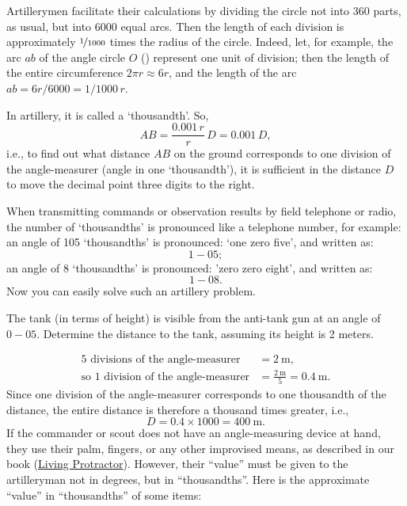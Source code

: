 Artillerymen facilitate their calculations by dividing the circle not into 360 parts, as usual, but into 6000 equal arcs. Then the length of each division is approximately $\nicefrac{1}{1000}$ times the radius of the circle. Indeed, let, for example, the arc $ab$ of the angle circle $O$ () represent one unit of division; then the length of the entire circumference $2 \pi r \approx 6r$, and the length of the arc $ab = 6r/6000 = 1/1000 \, r$.

In artillery, it is called a `thousandth'. So,
\begin{equation*}%
AB = \frac{0.001\,r}{r} \, D = 0.001 \, D,
\end{equation*}
i.e., to find out what distance $AB$ on the ground corresponds to one division of the angle-measurer (angle in one `thousandth'), it is sufficient in the distance $D$ to move the decimal point three digits to the right.

When transmitting commands or observation results by field telephone or radio, the number of `thousandths' is pronounced like a telephone number, for example: an angle of 105 `thousandths' is pronounced: `one zero five', and written as: 
\begin{equation*}%
1-05;
\end{equation*}
an angle of 8 `thousandths' is pronounced: 'zero zero eight', and written as:
\begin{equation*}%
1-08.
\end{equation*}
Now you can easily solve such an artillery problem.


\ques The tank (in terms of height) is visible from the anti-tank gun at an angle of $0-05$. Determine the distance to the tank, assuming its height is 2 meters.

\ans 
\begin{align*}%
\text{5 divisions of the angle-measurer} & = \SI{2}{\meter},\\
\text{so 1 division of the angle-measurer} & = \frac{\SI{2}{\meter}}{5} = \SI{0.4}{\meter}. 
\end{align*}
Since one division of the angle-measurer corresponds to one thousandth of the distance, the entire distance is therefore a thousand times greater, i.e.,
\begin{equation*}%
D = 0.4 \times 1000 = \SI{400}{\meter}.
\end{equation*} 
If the commander or scout does not have an angle-measuring device at hand, they use their palm, fingers, or any other improvised means, as described in our book (\hyperref[sec-3.7]{Living Protractor}). However, their ``value'' must be given to the artilleryman not in degrees, but in ``thousandths''. Here is the approximate ``value'' in ``thousandths'' of some items:


